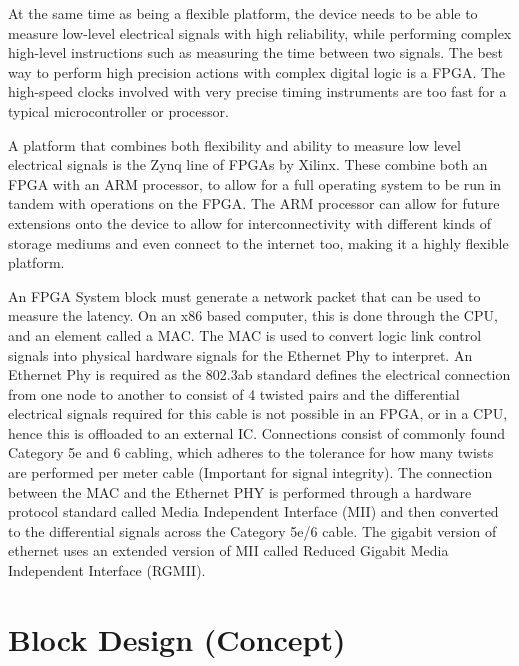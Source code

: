 At the same time as being a flexible platform, the device needs to be able to measure low-level electrical signals 
with high reliability, while performing complex high-level instructions such as measuring the time between two 
signals. The best way to perform high precision actions with complex digital logic is a FPGA. The high-speed clocks 
involved with very precise timing instruments are too fast for a typical microcontroller or processor. 

A platform that combines both flexibility and ability to measure low level electrical signals is the Zynq line of 
FPGAs by Xilinx. These combine both an FPGA with an ARM processor, to allow for a full operating system to be run in 
tandem with operations on the FPGA.  The ARM processor can allow for future extensions onto the device to allow for 
interconnectivity with different kinds of storage mediums and even connect to the internet too, making it a highly 
flexible platform. 

An FPGA System block must generate a network packet that can be used to measure the latency. On an x86 based computer, 
this is done through the CPU, and an element called a MAC. The MAC is used to convert logic link control signals 
into physical hardware signals for the Ethernet Phy to interpret. An Ethernet Phy is required as the 802.3ab 
standard defines the electrical connection from one node to another to consist of 4 twisted pairs and the 
differential electrical signals required for this cable is not possible in an FPGA, or in a CPU, hence this is 
offloaded to an external IC. Connections consist of commonly found Category 5e and 6 cabling, which adheres to the 
tolerance for how many twists are performed per meter cable (Important for signal integrity). The connection between 
the MAC and the Ethernet PHY is performed through a hardware protocol standard called Media Independent Interface 
(MII) and then converted to the differential signals across the Category 5e/6 cable. The gigabit version of ethernet 
uses an extended version of MII called Reduced Gigabit Media Independent Interface (RGMII).

\section{Block Design (Concept)}

\vspace{-3mm}

